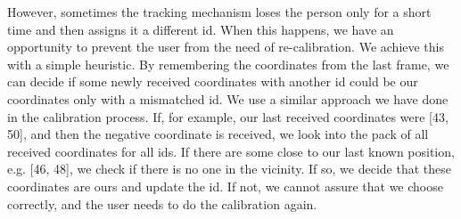 \documentclass{ctuthesis}
\begin{document}
However, sometimes the tracking mechanism loses the person only for a short time and then assigns it a different id. When this happens, we have an opportunity to prevent the user from the need of re-calibration. We achieve this with a simple heuristic. By remembering the coordinates from the last frame, we can decide if some newly received coordinates with another id could be our coordinates only with a mismatched id. We use a similar approach we have done in the calibration process. If, for example, our last received coordinates were [43, 50], and then the negative coordinate is received, we look into the pack of all received coordinates for all ids. If there are some close to our last known position, e.g. [46, 48], we check if there is no one in the vicinity. If so, we decide that these coordinates are ours and update the id. If not, we cannot assure that we choose correctly, and the user needs to do the calibration again.
\end{document}
